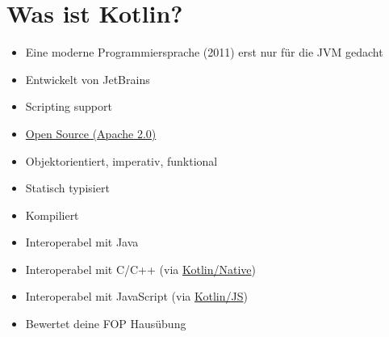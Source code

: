 \section{Was ist Kotlin?}\label{sec:was-ist-kotlin?}
\begin{frame}
    \slidehead
    \begin{itemize}[<+->]
    \item Eine moderne Programmiersprache (2011) erst nur für die JVM gedacht
    \item Entwickelt von JetBrains
    \item Scripting support
    \item \href{https://github.com/JetBrains/kotlin}{Open Source (Apache 2.0)}
    \item Objektorientiert, imperativ, funktional
    \item Statisch typisiert
    \item Kompiliert
    \item Interoperabel mit Java
    \item Interoperabel mit C/C++ (via \href{https://kotlinlang.org/docs/native-overview.html}{Kotlin/Native})
    \item Interoperabel mit JavaScript (via \href{https://kotlinlang.org/docs/js-overview.html}{Kotlin/JS})
    \item Bewertet deine FOP Hausübung
    \end{itemize}
\end{frame}
